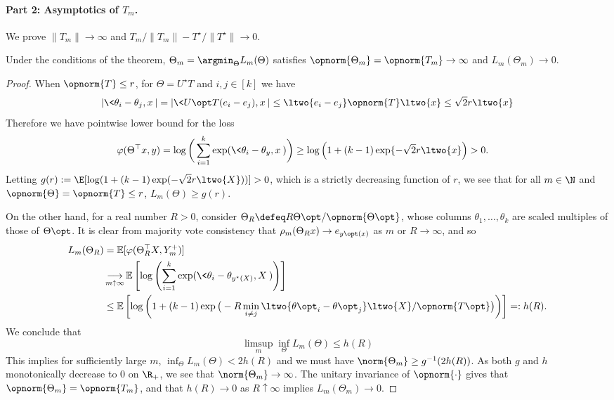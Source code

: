\documentclass[11pt]{article}
\newcommand{\Ep}{\mathbb{E}}
\newcommand{\prn}[1]{\left({#1}\right)} %
\newcommand{\brk}[1]{\left[{#1}\right]} %
\newcommand{\sloss}{\varphi}  %
\begin{document}
\paragraph{Part 2: Asymptotics of $T_m$.}
We prove $\|T_m\| \to \infty$ and $T_m/\|T_m\| - T^\star / \|T^\star\| \to
0$.
%
\begin{lemma}
  \label{lemma:norms-biggeroo}
  Under the conditions of the theorem,
  $\Theta_m = \argmin_\Theta L_m(\Theta)$
  satisfies
  $\opnorm{\Theta_m} = \opnorm{T_m} \to \infty$
  and $L_m(\Theta_m) \to 0$.
\end{lemma}
\begin{proof}
  When $\opnorm{T} \le r$, for $\Theta = U^\star T$ and $i, j \in [k]$ we have
  \begin{align*}
    |\<\theta_i - \theta_j, x\>|
    = |\<U\opt T (e_i - e_j), x\>|
    \le \ltwo{e_i - e_j} \opnorm{T} \ltwo{x}
    \le \sqrt{2} r \ltwo{x}
  \end{align*}
  Therefore we have pointwise lower bound for the loss
  \begin{align*}
    \sloss(\Theta^\top x, y)
    & = \log \bigg(\sum_{i=1}^{k} \exp(\<\theta_i - \theta_y, x\>)\bigg)
    \geq \log \prn{1 + (k-1) \exp\{-\sqrt{2} r \ltwo{x}} > 0.
  \end{align*}
  Letting $g(r) := \E[\log(1 + (k-1) \exp(-\sqrt{2} r \ltwo{X}))] > 0$,
  which is a strictly decreasing function of $r$,
  we see that for all $m \in \N$ and $\opnorm{\Theta}
  = \opnorm{T} \le r$, $L_m(\Theta) \geq g(r)$.

  On the other hand, for a real number $R > 0$, consider $\Theta_R \defeq R
  \Theta\opt / \opnorm{\Theta\opt}$, whose columns $\theta_1, \ldots,
  \theta_k$ are scaled multiples of those of $\Theta\opt$.
  It is clear from majority vote consistency that $\rho_m(\Theta_R x) \to
  e_{y\opt(x)}$ as $m$ or $R \to \infty$, and so
  \begin{align*}
    L_m(\Theta_R) & = \Ep [\sloss(\Theta_R^\top X, Y_m^+)] \\
    & \mathop{\longrightarrow}_{m\uparrow \infty}
    \Ep \brk{\log \prn{\sum_{i=1}^{k} \exp(\<\theta_i - \theta_{y^\star(X)}, X\>)}}  \nonumber \\
    & \leq \Ep \brk{\log \prn{1 + (k-1) \exp\big(
        -R \min_{i \neq j} \ltwo{\theta\opt_i - \theta\opt_j}
        \ltwo{X} / \opnorm{T\opt} \big)}}
    =: h(R).
  \end{align*}
  We conclude that
  \begin{equation*}
    \limsup_m \inf_\Theta L_m(\Theta) \le
    h(R)
  \end{equation*}
  This implies for sufficiently large $m$, $\inf_\Theta
  L_m(\Theta) < 2h(R)$ and we must have $\norm{\Theta_m} \geq g^{-1}(2h(R))$.
  As both $g$ and $h$ monotonically decrease to $0$ on $\R_+$, we see that
  $\norm{\Theta_m} \to \infty$.
  The unitary invariance of $\opnorm{\cdot}$ gives that
  $\opnorm{\Theta_m} = \opnorm{T_m}$,
  and that $h(R) \to 0$ as $R \uparrow \infty$ implies
  $L_m(\Theta_m) \to 0$.
\end{proof}
\end{document}
